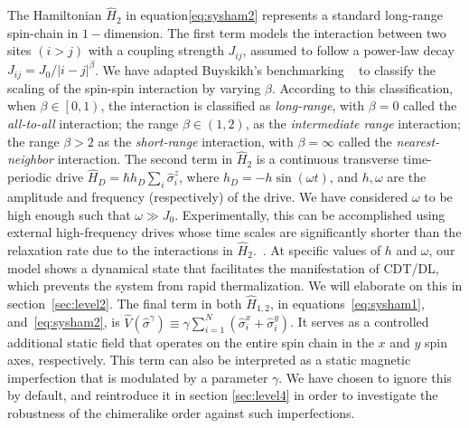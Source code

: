 \documentclass[12pt]{iopart}
\begin{document}
The Hamiltonian $\hat{H}_2$ in equation\eqref{eq:sysham2} represents a standard long-range spin-chain in $1-$dimension. The first term models the interaction between two sites $(i>j)$ with a coupling strength $J_{ij}$, assumed to follow a power-law decay $J_{ij}={J_0}/{|i-j|^\beta}$. We have adapted Buyskikh's benchmarking ~\cite{buyskikh_entanglement_2016} to classify the scaling of the spin-spin interaction by varying $\beta$. According to this classification, when $\beta\in\left[0,1\right)$, the interaction is classified as \textit{long-range}, with $\beta=0$ called the \textit{all-to-all} interaction; the range $\beta\in \left(1,2\right)$, as the \textit{ intermediate range} interaction; the range $\beta > 2$ as the \textit{ short-range} interaction, with $\beta= \infty$ called the \textit{ nearest-neighbor} interaction. The second term in $\hat{H}_2$ is a continuous transverse time-periodic drive $\displaystyle \hat{H}_D=\hbar h_D \sum_i\hat{\sigma}^z_i$, where $\displaystyle h_D = -h\sin{(\omega t)}$, and $h,\omega$ are the amplitude and frequency (respectively) of the drive. We have considered $\omega$ to be high enough such that $\omega\gg J_0$. 	Experimentally, this can be accomplished using external high-frequency drives whose time scales are significantly shorter than the relaxation rate due to the interactions in $\hat{H}_2$.~\cite{choi_observation_2017,zhang_observation_2017,Cirac_1995,Blatt_2012}. At specific values of $h$ and $\omega$, our model shows a dynamical state that facilitates the manifestation of CDT/DL, which prevents the system from rapid thermalization. We will elaborate on this in section~\ref{sec:level2}. The final term in both $\hat{H}_{1,2}$, in equations~\eqref{eq:sysham1}, and~\eqref{eq:sysham2}, is $\displaystyle \hat{V}(\hat{\sigma}^{\gamma}) \equiv\gamma  \sum_{i=1}^{N} (\hat{\sigma}^x_i + \hat{\sigma}^y_i)$. It serves as a controlled additional static field that operates on the entire spin chain in the $x$ and $y$ spin axes, respectively.  This term can also be interpreted as a static magnetic imperfection that is modulated by a parameter $\gamma$. We have chosen to ignore this by default, and reintroduce it in section \ref{sec:level4} in order to investigate the robustness of the chimeralike order against such imperfections.
\end{document}
